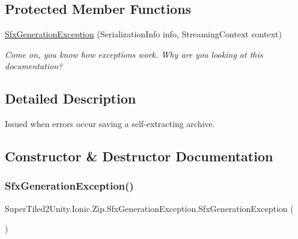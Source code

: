 \subsection*{Protected Member Functions}
\begin{DoxyCompactItemize}
\item 
\mbox{\hyperlink{class_super_tiled2_unity_1_1_ionic_1_1_zip_1_1_sfx_generation_exception_a074089a385432bfe2b1d4d9ee9a61ef9}{Sfx\+Generation\+Exception}} (Serialization\+Info info, Streaming\+Context context)
\begin{DoxyCompactList}\small\item\em Come on, you know how exceptions work. Why are you looking at this documentation? \end{DoxyCompactList}\end{DoxyCompactItemize}


\subsection{Detailed Description}
Issued when errors occur saving a self-\/extracting archive. 



\subsection{Constructor \& Destructor Documentation}
\mbox{\label{class_super_tiled2_unity_1_1_ionic_1_1_zip_1_1_sfx_generation_exception_a93ad14e02bc564184fe754e4af0b157d}} 
\subsubsection{\texorpdfstring{Sfx\+Generation\+Exception()}{SfxGenerationException()}\hspace{0.1cm}{\footnotesize\ttfamily [1/3]}}
{\footnotesize\ttfamily Super\+Tiled2\+Unity.\+Ionic.\+Zip.\+Sfx\+Generation\+Exception.\+Sfx\+Generation\+Exception (\begin{DoxyParamCaption}{ }\end{DoxyParamCaption})}



